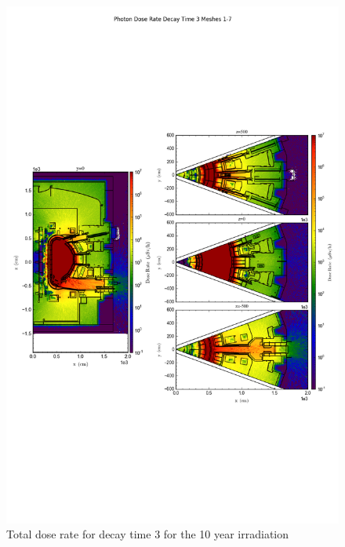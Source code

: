 \documentclass[12pt]{article}
\begin{document}
\clearpage
\begin{figure}[ht!]
\centering
\includegraphics[trim={0cm 8cm, 0cm 8cm},clip,scale=0.75]{../plots/final_model_with_b4c/10year/Photon_Dose_Rate_Decay_Time_3_Meshes_1-7.png}
\caption{Total dose rate for decay time 3 for the 10 year irradiation}
\label{fig:photons_10y_dc3_b4c_dose}
\end{figure}
\end{document}

